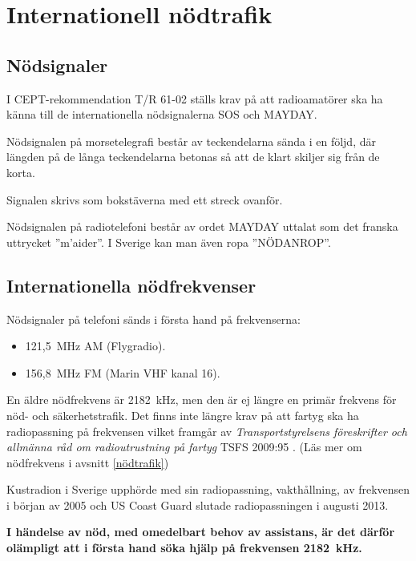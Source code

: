 \section{Internationell nödtrafik}

\subsection{Nödsignaler}

I CEPT-rekommendation T/R 61-02 \cite{TR6102} ställs krav på att radioamatörer
ska ha känna till de internationella nödsignalerna SOS och MAYDAY.

Nödsignalen på morsetelegrafi består av teckendelarna \Mcharsep\MSOS %
sända i en följd, där längden på de långa teckendelarna betonas så att de klart
skiljer sig från de korta.

Signalen skrivs som bokstäverna  med ett streck ovanför.

Nödsignalen på radiotelefoni består av ordet MAYDAY uttalat som det franska
uttrycket ''m'aider''. I Sverige kan man även ropa ''NÖDANROP''.

\subsection{Internationella nödfrekvenser}

Nödsignaler på telefoni sänds i första hand på frekvenserna:
\begin{itemize}
  \item 121,5~MHz AM (Flygradio).
  \item 156,8~MHz FM (Marin VHF kanal 16).
\end{itemize}

En äldre nödfrekvens är 2182~kHz, men den är ej längre en primär frekvens för
nöd- och säkerhetstrafik.
Det finns inte längre krav på att fartyg ska ha radiopassning på frekvensen
vilket framgår av \emph{Transportstyrelsens föreskrifter och allmänna råd
	om radioutrustning på fartyg} TSFS 2009:95 \cite[\S22]{TSFS2009:95}.
(Läs mer om nödfrekvens i avsnitt \ref{nödtrafik})

Kustradion i Sverige upphörde med sin radiopassning, vakthållning, av frekvensen
i början av 2005 och US Coast Guard slutade radiopassningen i augusti 2013.

\textbf{I händelse av nöd, med omedelbart behov av assistans, är det därför
	olämpligt att i första hand söka hjälp på frekvensen 2182~kHz.}

